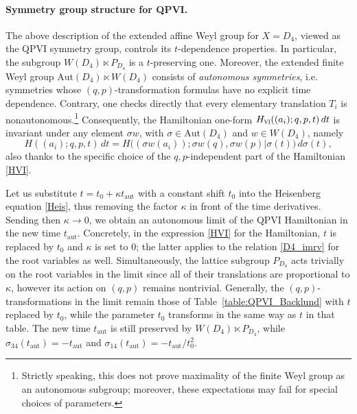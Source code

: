 \documentclass[12pt,a4paper]{article}
\numberwithin{equation}{section}
\newcommand{\VI}{\scalebox{.6}{VI}}
\begin{document}
\paragraph{Symmetry group structure for QPVI.}
The above description of the extended affine Weyl group for $X=D_4$, viewed as the QPVI symmetry group, controls its $t$-dependence properties. In particular, the subgroup $W(D_4)\ltimes P_{D_4}$ is a $t$-preserving one. Moreover, the extended finite Weyl group $\mathrm{Aut}(D_4)\ltimes W(D_4)$ consists of \textit{autonomous symmetries}, i.e. symmetries whose $(q,p)$-transformation formulas have no explicit time dependence. Contrary, one checks directly that every elementary translation $T_i$ is nonautonomous.\footnote{Strictly speaking, this does not prove maximality of the finite Weyl group as an autonomous subgroup; moreover, these expectations may fail for special choices of parameters.} Consequently, the Hamiltonian one-form $H_{\VI}((a_i);q,p,t)\,dt$ is invariant under any element $\sigma w$, with $\sigma\in \mathrm{Aut}(D_4)$ and $w\in W(D_4)$, namely 
\begin{equation}\label{Ham_inv}
H((a_i);q,p,t)\,dt= H\big((\sigma w(a_i));\sigma w(q),\sigma w(p)|\sigma(t)\big)\, d\sigma(t), 
\end{equation}
also thanks to the specific choice of the $q,p$-independent part of the Hamiltonian \eqref{HVI}.

Let us substitute $t=t_0+\kappa t_{\textrm{aut}}$ with a constant shift $t_0$ into the Heisenberg equation \eqref{Heis}, thus removing the factor $\kappa$ in front of the time derivatives. Sending then $\kappa\rightarrow0$, we obtain an autonomous limit of the QPVI Hamiltonian in the new time $t_{\textrm{aut}}$. Concretely, in the expression \eqref{HVI} for the Hamiltonian, $t$ is replaced by $t_0$ and $\kappa$ is set to $0$; the latter applies to the relation \eqref{D4_imrv} for the root variables as well. Simultaneously, the lattice subgroup $P_{D_4}$ acts trivially on the root variables in the limit since all of their translations are proportional to $\kappa$, however its action on $(q,p)$ remains nontrivial. Generally, the $(q,p)$-transformations in the limit remain those of  Table~\ref{table:QPVI_Backlund}
with $t$ replaced by $t_0$, while
the parameter $t_0$ transforms in the same way as $t$ in that table. The new time  $t_{\textrm{aut}}$ is still preserved by $W(D_4)\ltimes P_{D_4}$, while $\sigma_{34}(t_{\textrm{aut}})=-t_{\textrm{aut}}$ and $\sigma_{14}(t_{\textrm{aut}})=-t_{\textrm{aut}}/t_0^2$. 
\end{document}
